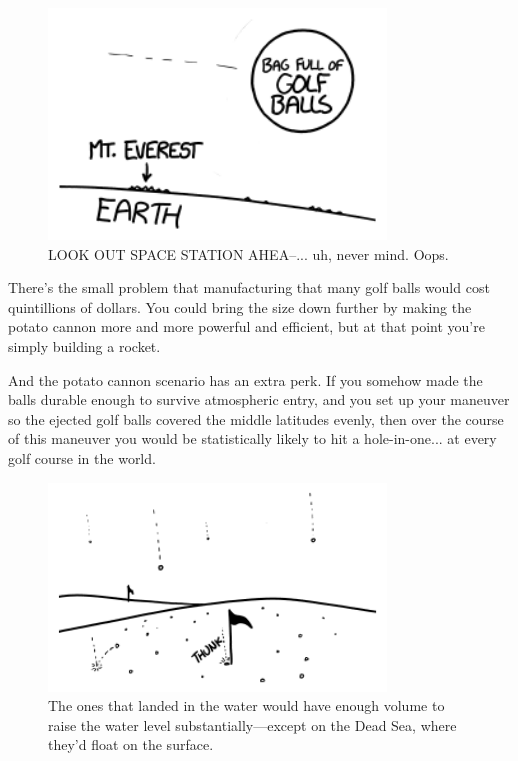 {\begin{figure}[!htbp]
\centering
\includegraphics[scale=0.5, max width=0.8\textwidth]{imgs/a/85/golf_310.png}
\caption{LOOK OUT SPACE STATION AHEA--... uh, never mind. Oops.}
\end{figure}

{There's the small problem that manufacturing that many golf balls would cost quintillions of dollars. You could bring the size down further by making the potato cannon more and more powerful and efficient, but at that point you're simply building a rocket.}

{And the potato cannon scenario has an extra perk. If you somehow made the balls durable enough to survive atmospheric entry, and you set up your maneuver so the ejected golf balls covered the middle latitudes evenly, then over the course of this maneuver you would be statistically likely to hit a hole-in-one... at every golf course in the world.}

\begin{figure}[!htbp]
\centering
\includegraphics[scale=0.5, max width=0.8\textwidth]{imgs/a/85/golf_final.png}
\caption{The ones that landed in the water would have enough volume to raise the water level substantially—except on the Dead Sea, where they'd float on the surface.}
\end{figure}

}
